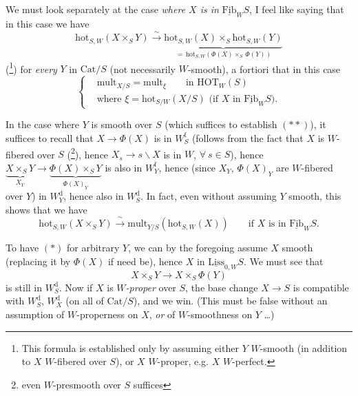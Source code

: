 We must look separately at the case \textit{where $X$ is in} $\underline{\mathrm{Fib}}_W S$, I feel like saying that in this case we have
\[
\mathrm{hot}_{S,W}(X\times_S Y) \xrightarrow{\ \sim\ } \underbrace{\mathrm{hot}_{S,W}(X)\times_S \mathrm{hot}_{S,W}(Y)}_{=\,\mathrm{hot}_{S,W}(\Phi(X)\times_S\, \Phi(Y))} \tag*{$(*)$} %
\]
(\footnote{This formula is established only by assuming either $Y$ $W$-smooth (in addition to $X$ $W$-fibered over $S$), or $X$ $W$-proper, e.g. $X$ $W$-perfect.}) for \textit{every} $Y$ in $\mathrm{Cat}/S$ (not necessarily $W$-smooth), a fortiori that in this case
\[
\left\{\begin{aligned}
&\mathrm{mult}_{X/S} = \mathrm{mult}_\xi \qquad \text{in } \mathrm{HOT}_W(S)\\
&\text{where } \xi = \mathrm{hot}_{S/W}(X/S) \text{ (if $X$ in $\underline{\mathrm{Fib}}_W S$).} %
\end{aligned}\right. \tag*{$(**)$}
\]


In the case where $Y$ is smooth over $S$ (which suffices to establish $(**)$), it suffices to recall that $X\longrightarrow \Phi(X)$ is in $W_S^{\mathrm{f}}$ (follows from the fact that $X$ is $W$-fibered over $S$ (\footnote{even $W$-presmooth over $S$ suffices}), hence $X_s \longrightarrow s\backslash X$ is in $W$, $\forall\ s\in S$), hence $\underbrace{X\times_S Y}_{X_Y} \longrightarrow \underbrace{\Phi(X)\times_S Y}_{\Phi(X)_Y}$ is also in $W_Y^{\mathrm{f}}$, hence (since $X_Y$, $\Phi(X)_Y$ are $W$-fibered over $Y$) in $W_Y^{\mathrm{d}}$, hence also in $W_S^{\mathrm{d}}$. In fact, even without assuming $Y$ smooth, this shows that we have
\[
\mathrm{hot}_{S,W}(X\times_S Y) \xrightarrow{\ \sim\ } \mathrm{mult}_{Y/S}(\mathrm{hot}_{S,W}(X)) \qquad \text{if $X$ is in $\underline{\mathrm{Fib}}_W S$.} \tag*{$(*)$}
\]

To have $(*)$ for arbitrary $Y$, we can by the foregoing assume $X$ smooth (replacing it by $\Phi(X)$ if need be), hence $X$ in $\underline{\mathrm{Liss}}_{0,W}S$. We must see that
\[
X\times_S Y \longrightarrow X\times_S \Phi(Y)
\]
is still in $W_S^{\mathrm{d}}$. Now if $X$ is \textit{$W$-proper} over $S$, the base change $X\longrightarrow S$ is compatible with $W_S^{\mathrm{d}}$, $W_X^{\mathrm{d}}$ (on all of $\mathrm{Cat}/S$), and we win. (This must be false without an assumption of $W$-properness on $X$, \textit{or} of $W$-smoothness on $Y$ \dots)

